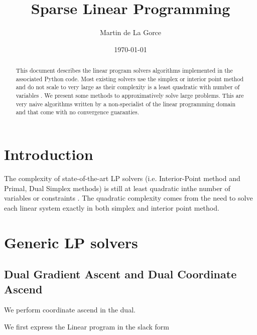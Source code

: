 \documentclass[11pt]{article}
\begin{document}
\title{Sparse Linear Programming}
\author{Martin de La Gorce}
\date{\today}
\maketitle

\begin{abstract}
    This document describes the linear program solvers algorithms implemented in the associated Python code. Most existing solvers use the simplex or interior point method and do not scale to very large as their complexity is a least quadratic with number of variables \cite{NocedalWright2006}. We present some methods to approximatively solve large problems. This are very naive algorithms written by a non-specialist of the linear programming domain and that come with no convergence guaranties.
\end{abstract}


\tableofcontents

\section{Introduction}

The complexity of state-of-the-art LP
solvers (i.e. Interior-Point method and Primal, Dual Simplex methods) is still at least quadratic inthe number of variables or constraints \cite{NocedalWright2006}.
The quadratic complexity comes from the need to solve each linear system exactly in both simplex and interior point method.

\section{Generic LP solvers}
\subsection{Dual Gradient Ascent and Dual Coordinate Ascend}

We perform coordinate ascend in the dual. 

We first express the Linear program in the slack form
\end{document}
